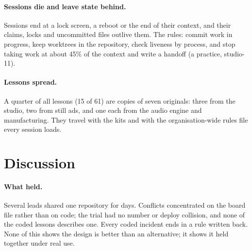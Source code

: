 \documentclass[11pt]{article}
\begin{document}
\paragraph{Sessions die and leave state behind.}
Sessions end at a lock screen, a reboot or the end of their context, and their claims,
locks and uncommitted files outlive them. The rules: commit work in progress, keep
worktrees in the repository, check liveness by process, and stop taking work at about
45\% of the context and write a handoff (a practice, studio-11). %

\paragraph{Lessons spread.}
A quarter of all lessons (15 of 61) are copies of seven originals: three from the studio, %
two from still ads, and one each from the audio engine and manufacturing. They travel %
with the kits and with the organisation-wide rules file every session loads.

\section{Discussion}\label{sec:discussion}

\paragraph{What held.}
Several leads shared one repository for days. Conflicts concentrated on the board file
rather than on code; the trial had no number or deploy collision, and none of the coded
lessons describes one. Every coded incident ends in a rule written back. None of
this shows the design is better than an alternative; it shows it held together under
real use.
\end{document}
